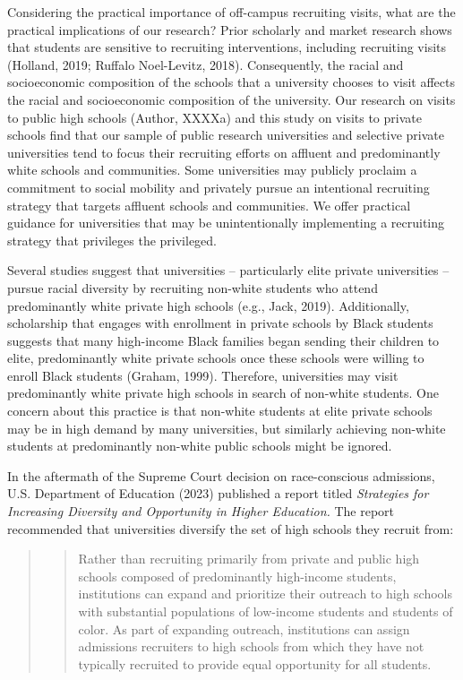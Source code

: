 \documentclass[
  12pt,
]{article}
\begin{document}
Considering the practical importance of off-campus recruiting visits, what are the practical implications of our research? Prior scholarly and market research shows that students are sensitive to recruiting interventions, including recruiting visits (Holland, 2019; Ruffalo Noel-Levitz, 2018). Consequently, the racial and socioeconomic composition of the schools that a university chooses to visit affects the racial and socioeconomic composition of the university. Our research on visits to public high schools (Author, XXXXa) and this study on visits to private schools find that our sample of public research universities and selective private universities tend to focus their recruiting efforts on affluent and predominantly white schools and communities. Some universities may publicly proclaim a commitment to social mobility and privately pursue an intentional recruiting strategy that targets affluent schools and communities. We offer practical guidance for universities that may be unintentionally implementing a recruiting strategy that privileges the privileged.

Several studies suggest that universities -- particularly elite private universities -- pursue racial diversity by recruiting non-white students who attend predominantly white private high schools (e.g., Jack, 2019). Additionally, scholarship that engages with enrollment in private schools by Black students suggests that many high-income Black families began sending their children to elite, predominantly white private schools once these schools were willing to enroll Black students (Graham, 1999). Therefore, universities may visit predominantly white private high schools in search of non-white students. One concern about this practice is that non-white students at elite private schools may be in high demand by many universities, but similarly achieving non-white students at predominantly non-white public schools might be ignored.

In the aftermath of the Supreme Court decision on race-conscious admissions, U.S. Department of Education (2023) published a report titled \emph{Strategies for Increasing Diversity and Opportunity in Higher Education.} The report recommended that universities diversify the set of high schools they recruit from:

\begin{quote}
\begin{quote}
Rather than recruiting primarily from private and public high schools composed of predominantly high-income students, institutions can expand and prioritize their outreach to high schools with substantial populations of low-income students and students of color. As part of expanding outreach, institutions can assign admissions recruiters to high schools from which they have not typically recruited to provide equal opportunity for all students.
\end{quote}
\end{quote}
\end{document}
